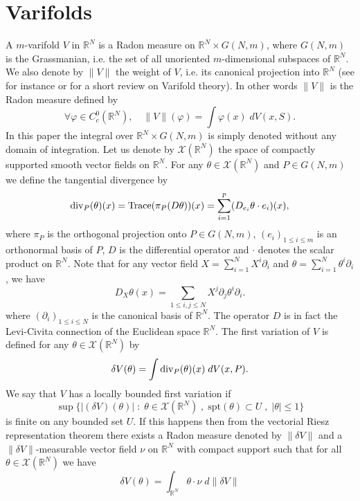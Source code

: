 \documentclass[12pt,english]{smfart} %
\theoremstyle{remark}
\newcommand{\R}{\mathbb{R}}
\newcommand{\spt}{\mathrm{spt}}
\begin{document}
\section{Varifolds}
\label{SectionVarifolds}
A $m$-varifold $V$  in $\mathbb{R}^N$ is a Radon measure on $\mathbb{R}^N\times G(N,m)$, where $G(N,m)$ is the Grassmanian, i.e. the set of all unoriented $m$-dimensional subspaces of $\mathbb{R}^N$.  We also denote by  $\|V\|$ the weight  of $V$, i.e. its canonical projection into $\mathbb{R}^N$ (see for instance \cite{Sim} or \cite{Ton} for a short review on Varifold theory). In other words $\|V\|$ is the Radon measure defined by 
$$\forall \varphi \in C^0_c(\mathbb{R}^N), \quad\|V\|(\varphi)=\int \varphi(x) \;dV(x,S).$$
In this paper the integral over $\mathbb{R}^N\times G(N,m)$ is simply denoted without any domain of integration. Let us denote by $\mathcal{X}(\R^N)$ the space of compactly supported smooth vector fields on $\R^{N}$. For any $\theta\in\mathcal{X}(\R^N)$ and $P \in G(N,m)$ we define the tangential divergence by
$${\rm div}_P(\theta)(x) = {\rm Trace}(\pi_P(D\theta))(x)=\sum_{i=1}^p(D_{e_i}\theta \cdot e_i)(x),$$
where $\pi_P$ is the orthogonal projection onto $P \in G(N,m)$, $(e_i)_{1\leqslant i\leqslant m}$ is an orthonormal basis of $P$, $D$ is the differential operator and $\cdot$ denotes the scalar product on $\R^N$. Note that for any vector field $X=\sum_{i=1}^NX^i\partial_i$ and $\theta=\sum_{i=1}^N\theta^i\partial_i$, we have $$D_X\theta(x)=\displaystyle\sum_{1\leqslant i,j\leqslant N}X^j\partial_j\theta^i\partial_i.$$
where $(\partial_i)_{1\leqslant i\leqslant N}$ is the canonical basis of $\R^N$. The operator $D$ is in fact the Levi-Civita connection of the Euclidean space $\R^N$. The first variation of $V$ is defined for any $\theta\in\mathcal{X}(\R^N)$ by
\begin{equation}\label{First-variation}
\delta V(\theta) = \int  {\rm div}_P( \theta)(x) \;d V(x,P).
\end{equation}
We say that $V$ has a locally bounded first variation  if 
$$\sup \{|(\delta V)(\theta)| \;  : \; \theta \in\mathcal{X}(\R^N)\; ,\; \spt(\theta)\subset U\; ,\; |\theta|\leqslant 1 \}$$
is finite on any bounded set $U$. If this happens then from the vectorial Riesz representation theorem there exists a Radon measure denoted by $\|\delta V\|$ and a  $\|\delta V\|$-measurable vector field $\nu$ on $\R^N$ with compact support such that for all $\theta\in\mathcal{X}(\R^N)$ we have
\begin{equation}\label{Riesz-representation}
\delta V(\theta)=\int_{\R^N}\theta\cdot\nu\; d\|\delta V\|
\end{equation}
\end{document}
